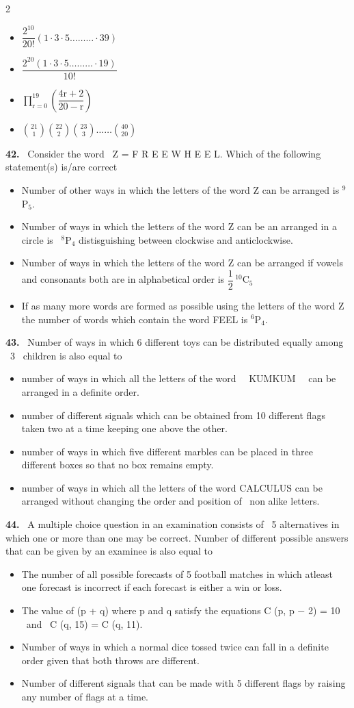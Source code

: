 \documentclass[10pt]{extarticle}
\newcommand{\qn}[1]{\par\smallskip\noindent\textbf{#1.}~}
\newenvironment{qoptions}{\begin{itemize}[leftmargin=1.8em,itemsep=1pt,topsep=2pt,label={}]}{\end{itemize}}
\newcommand{\opt}[2]{\item[(#1)] #2}
\begin{document}
\begin{multicols}{2}
\begin{qoptions}
\opt{A}{$\dfrac{2^{10}}{20!}(1\cdot3\cdot5\dots\dots\dots\cdot39)$}
\opt{B}{$\dfrac{2^{20}(1\cdot3\cdot5\dots\dots\dots\cdot19)}{10!}$}
\opt{C}{$\displaystyle\prod_{\mathrm r=0}^{19}\left(\dfrac{4\mathrm r+2}{20-\mathrm r}\right)$}
\opt{D}{$\binom{21}{1}\binom{22}{2}\binom{23}{3}\dots\dots\binom{40}{20}$}
\end{qoptions}
\qn{42} Consider the word \ Z = F R E E W H E E L. Which of the following statement(s) is/are correct
\begin{qoptions}
\opt{A}{Number of other ways in which the letters of the word Z can be arranged is $^9$P$_5$.}
\opt{B}{Number of ways in which the letters of the word Z can be an arranged in a circle is \ $^8$P$_4$ distisguishing between clockwise and anticlockwise.}
\opt{C}{Number of ways in which the letters of the word Z can be arranged if vowels and consonants both are in alphabetical order is $\dfrac12\,{}^{10}\mathrm C_5$}
\opt{D}{If as many more words are formed as possible using the letters of the word Z the number of words which contain the word FEEL is $^6$P$_4$.}
\end{qoptions}
\qn{43} Number of ways in which 6 different toys can be distributed equally among \ 3 \ children is also equal to
\begin{qoptions}
\opt{A}{number of ways in which all the letters of the word \ \ KUMKUM \ \ can be arranged in a definite order.}
\opt{B}{number of different signals which can be obtained from 10 different flags taken two at a time keeping one above the other.}
\opt{C}{number of ways in which five different marbles can be placed in three different boxes so that no box remains empty.}
\opt{D}{number of ways in which all the letters of the word CALCULUS can be arranged without changing the order and position of \ non alike letters.}
\end{qoptions}
\qn{44} A multiple choice question in an examination consists of \ 5 alternatives in which one or more than one may be correct. Number of different possible answers that can be given by an examinee is also equal to
\begin{qoptions}
\opt{A}{The number of all possible forecasts of 5 football matches in which atleast one forecast is incorrect if each forecast is either a win or loss.}
\opt{B}{The value of (p + q) where p and q satisfy the equations C (p, p $-$ 2) = 10 \ and \ C (q, 15) = C (q, 11).}
\opt{C}{Number of ways in which a normal dice tossed twice can fall in a definite order given that both throws are different.}
\opt{D}{Number of different signals that can be made with 5 different flags by raising any number of flags at a time.}

\end{qoptions}
\end{multicols}
\end{document}
